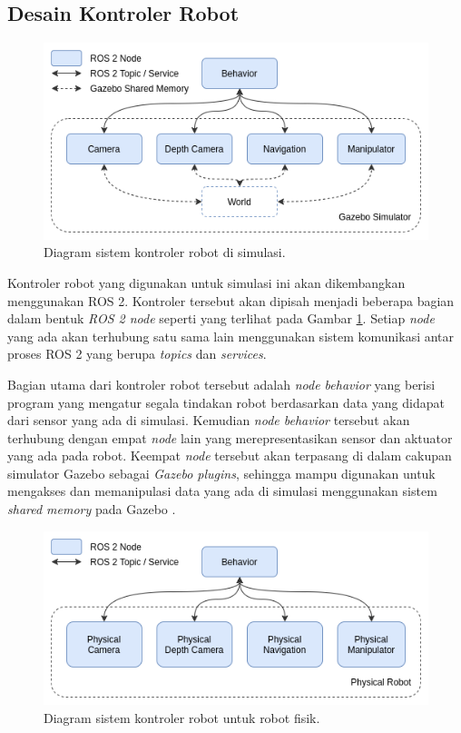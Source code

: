 \subsection{Desain Kontroler Robot}
\label{subsec:desainkontroler}

\begin{figure} [ht]
  \centering
  \includegraphics[scale=0.45]{images/simulation-controller.png}
  \caption{Diagram sistem kontroler robot di simulasi.}
  \label{fig:kontrolersimulasi}
\end{figure}

Kontroler robot yang digunakan untuk simulasi ini akan dikembangkan menggunakan ROS 2.
Kontroler tersebut akan dipisah menjadi beberapa bagian dalam bentuk \emph{ROS 2 node} seperti yang terlihat pada Gambar \ref{fig:kontrolersimulasi}.
Setiap \emph{node} yang ada akan terhubung satu sama lain menggunakan sistem komunikasi antar proses ROS 2 yang berupa \emph{topics} dan \emph{services}.

Bagian utama dari kontroler robot tersebut adalah \emph{node behavior} yang berisi program yang mengatur segala tindakan robot berdasarkan data yang didapat dari sensor yang ada di simulasi.
Kemudian \emph{node behavior} tersebut akan terhubung dengan empat \emph{node} lain yang merepresentasikan sensor dan aktuator yang ada pada robot.
Keempat \emph{node} tersebut akan terpasang di dalam cakupan simulator Gazebo sebagai \emph{Gazebo plugins}, sehingga mampu digunakan untuk mengakses dan memanipulasi data yang ada di simulasi menggunakan sistem \emph{shared memory} pada Gazebo \citep{gazeboplugins}.

\begin{figure} [ht] \centering
  \includegraphics[scale=0.45]{images/real-robot-controller.png}
  \caption{Diagram sistem kontroler robot untuk robot fisik.}
  \label{fig:kontrolerfisik}
\end{figure}

